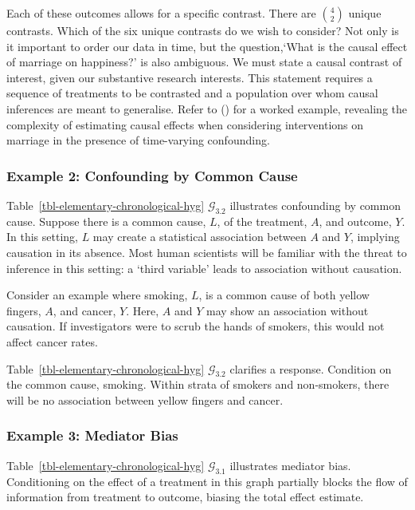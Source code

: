 \documentclass[
  single column]{article}
\begin{document}
Each of these outcomes allows for a specific contrast. There are
\(\binom{4}{2}\) unique contrasts. Which of the six unique contrasts do
we wish to consider? Not only is it important to order our data in time,
but the question,`What is the causal effect of marriage on happiness?'
is also ambiguous. We must state a causal contrast of interest, given
our substantive research interests. This statement requires a sequence
of treatments to be contrasted and a population over whom causal
inferences are meant to generalise. Refer to
() for a worked example, revealing
the complexity of estimating causal effects when considering
interventions on marriage in the presence of time-varying confounding.

\subsubsection{Example 2: Confounding by Common
Cause}\label{example-2-confounding-by-common-cause}

Table~\ref{tbl-elementary-chronological-hyg} \(\mathcal{G}_{3.2}\)
illustrates confounding by common cause. Suppose there is a common
cause, \(L\), of the treatment, \(A\), and outcome, \(Y\). In this
setting, \(L\) may create a statistical association between \(A\) and
\(Y\), implying causation in its absence. Most human scientists will be
familiar with the threat to inference in this setting: a `third
variable' leads to association without causation.

Consider an example where smoking, \(L\), is a common cause of both
yellow fingers, \(A\), and cancer, \(Y\). Here, \(A\) and \(Y\) may show
an association without causation. If investigators were to scrub the
hands of smokers, this would not affect cancer rates.

Table~\ref{tbl-elementary-chronological-hyg} \(\mathcal{G}_{3.2}\)
clarifies a response. Condition on the common cause, smoking. Within
strata of smokers and non-smokers, there will be no association between
yellow fingers and cancer.

\subsubsection{Example 3: Mediator Bias}\label{example-3-mediator-bias}

Table~\ref{tbl-elementary-chronological-hyg} \(\mathcal{G}_{3.1}\)
illustrates mediator bias. Conditioning on the effect of a treatment in
this graph partially blocks the flow of information from treatment to
outcome, biasing the total effect estimate.
\end{document}
